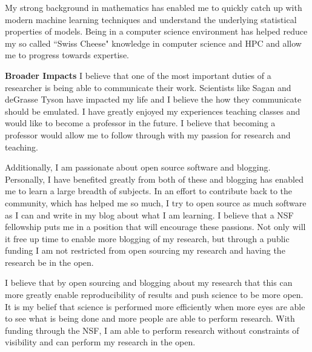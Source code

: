 \documentclass[12pt]{article}
\begin{document}
My strong background in mathematics has enabled me to quickly catch up with
modern machine learning techniques and understand the underlying statistical
properties of models. Being in a computer science environment has helped reduce
my so called ``Swiss Cheese" knowledge in computer science and HPC and allow me 
to progress towards expertise. 

\textbf{Broader Impacts}
%
I believe that one of the most important duties of a researcher is being able to
communicate their work. Scientists like Sagan and deGrasse Tyson have impacted
my life and I believe the how they communicate should be emulated. I have
greatly enjoyed my experiences teaching classes and would like to become a
professor in the future. I believe that becoming a professor would allow me to
follow through with my passion for research and teaching. 

Additionally, I am passionate about open source software and blogging.
Personally, I have benefited greatly from both of these and blogging has enabled
me to learn a large breadth of subjects. In an effort to contribute back to the
community, which has helped me so much, I try to open source as much software as
I can and write in my blog about what I am learning. I believe that a NSF
fellowship puts me in a position that will encourage these passions. Not only
will it free up time to enable more blogging of my research, but through a
public funding I am not restricted from open sourcing my research and having the
research be in the open.

I believe that by open sourcing and blogging about my research that this can
more greatly enable reproducibility of results and push science to be more open.
It is my belief that science is performed more efficiently when more eyes are
able to see what is being done and more people are able to perform research.
With funding through the NSF, I am able to perform research without constraints
of visibility and can perform my research in the open.

%
\end{document}

